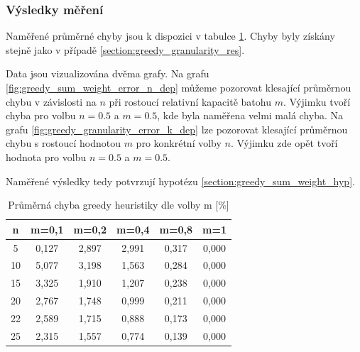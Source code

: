\documentclass[12pt]{article}
\begin{document}
\subsubsection*{Výsledky měření}

Naměřené průměrné chyby jsou k dispozici v tabulce \ref{tab:greedy_sum_weight_error}. Chyby byly získány stejně jako v případě \ref{section:greedy_granularity_res}.

Data jsou vizualizována dvěma grafy. Na grafu \ref{fig:greedy_sum_weight_error_n_dep} můžeme pozorovat klesající průměrnou chybu v závislosti na $n$ při rostoucí relativní kapacitě batohu $m$. Výjimku tvoří chyba pro volbu $n=0.5$ a $m=0.5$, kde byla naměřena velmi malá chyba. Na grafu \ref{fig:greedy_granularity_error_k_dep} lze pozorovat klesající průměrnou chybu s rostoucí hodnotou $m$ pro konkrétní volby $n$. Výjimku zde opět tvoří hodnota pro volbu $n=0.5$ a $m=0.5$.

Naměřené výsledky tedy potvrzují hypotézu \ref{section:greedy_sum_weight_hyp}.

\begin{table}
    \begin{center}
         \begin{tabular}{|c | c | c | c | c | c|} 
         \hline
         n & m=0,1 & m=0,2 & m=0,4 & m=0,8 & m=1 \\ [0.1ex] 
         \hline\hline
            5 & 0,127 & 2,897 & 2,991 & 0,317 & 0,000 \\
            \hline
            10 & 5,077 & 3,198 & 1,563 & 0,284 & 0,000 \\
            \hline
            15 & 3,325 & 1,910 & 1,207 & 0,238 & 0,000 \\
            \hline
            20 & 2,767 & 1,748 & 0,999 & 0,211 & 0,000 \\
            \hline
            22 & 2,589 & 1,715 & 0,888 & 0,173 & 0,000 \\
            \hline
            25 & 2,315 & 1,557 & 0,774 & 0,139 & 0,000 \\
            \hline
        \end{tabular}
        \caption{Průměrná chyba greedy heuristiky dle volby m [\%]}
        \label{tab:greedy_sum_weight_error}
    \end{center}
\end{table}
\end{document}
